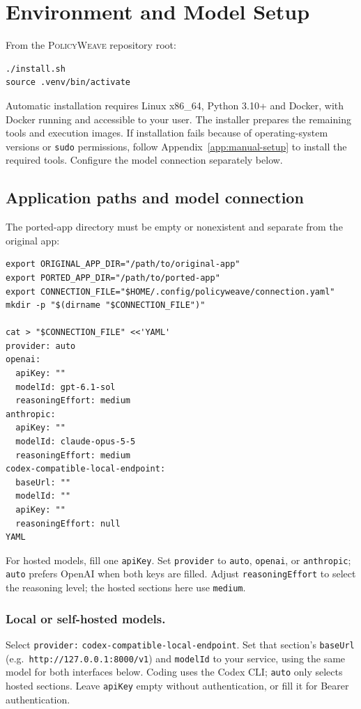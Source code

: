 \documentclass[10pt,letterpaper]{article}
\newcommand{\tool}{\textsc{PolicyWeave}}
\begin{document}
\section{Environment and Model Setup}
\label{app:setup}

From the {\tool} repository root:
\begin{lstlisting}
./install.sh
source .venv/bin/activate
\end{lstlisting}
Automatic installation requires Linux x86\_64, Python 3.10+ and Docker, with Docker running
and accessible to your user. The installer prepares the remaining tools and
execution images. If installation fails because of operating-system versions
or \texttt{sudo} permissions, follow Appendix~\ref{app:manual-setup} to
install the required tools. Configure the model connection separately below.

\subsection*{Application paths and model connection}
The ported-app directory must be empty or nonexistent and separate from the
original app:
\begin{lstlisting}
export ORIGINAL_APP_DIR="/path/to/original-app"
export PORTED_APP_DIR="/path/to/ported-app"
export CONNECTION_FILE="$HOME/.config/policyweave/connection.yaml"
mkdir -p "$(dirname "$CONNECTION_FILE")"

cat > "$CONNECTION_FILE" <<'YAML'
provider: auto
openai:
  apiKey: ""
  modelId: gpt-6.1-sol
  reasoningEffort: medium
anthropic:
  apiKey: ""
  modelId: claude-opus-5-5
  reasoningEffort: medium
codex-compatible-local-endpoint:
  baseUrl: ""
  modelId: ""
  apiKey: ""
  reasoningEffort: null
YAML
\end{lstlisting}

For hosted models, fill one \texttt{apiKey}. Set \texttt{provider} to \texttt{auto},
\texttt{openai}, or \texttt{anthropic}; \texttt{auto} prefers OpenAI when both
keys are filled. Adjust \texttt{reasoningEffort} to select the reasoning level;
the hosted sections here use \texttt{medium}.

\subsubsection*{Local or self-hosted models.}
Select \texttt{provider:} \nolinkurl{codex-compatible-local-endpoint}. Set that
section's \texttt{baseUrl} (e.g.\ \nolinkurl{http://127.0.0.1:8000/v1}) and
\texttt{modelId} to your service, using the same model for both interfaces below.
Coding uses the Codex CLI; \texttt{auto} only selects hosted sections.
Leave \texttt{apiKey} empty without
authentication, or fill it for Bearer authentication.
\end{document}
